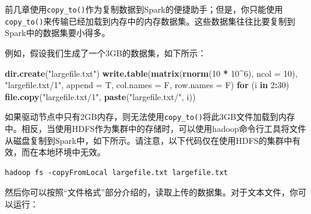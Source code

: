 \documentclass[
]{article}
\newenvironment{Shaded}{\begin{snugshade}}{\end{snugshade}}
\newcommand{\ControlFlowTok}[1]{\textcolor[rgb]{0.13,0.29,0.53}{\textbf{#1}}}
\newcommand{\DataTypeTok}[1]{\textcolor[rgb]{0.13,0.29,0.53}{#1}}
\newcommand{\DecValTok}[1]{\textcolor[rgb]{0.00,0.00,0.81}{#1}}
\newcommand{\KeywordTok}[1]{\textcolor[rgb]{0.13,0.29,0.53}{\textbf{#1}}}
\newcommand{\NormalTok}[1]{#1}
\newcommand{\OperatorTok}[1]{\textcolor[rgb]{0.81,0.36,0.00}{\textbf{#1}}}
\newcommand{\StringTok}[1]{\textcolor[rgb]{0.31,0.60,0.02}{#1}}
\begin{document}
前几章使用\texttt{copy\_to()}作为复制数据到Spark的便捷助手；但是，你只能使用\texttt{copy\_to()}来传输已经加载到内存中的内存数据集。这些数据集往往比要复制到Spark中的数据集要小得多。

例如，假设我们生成了一个3GB的数据集，如下所示：

\begin{Shaded}
\begin{Highlighting}[]
\KeywordTok{dir.create}\NormalTok{(}\StringTok{"largefile.txt"}\NormalTok{)}
\KeywordTok{write.table}\NormalTok{(}\KeywordTok{matrix}\NormalTok{(}\KeywordTok{rnorm}\NormalTok{(}\DecValTok{10} \OperatorTok{*}\StringTok{ }\DecValTok{10}\OperatorTok{^}\DecValTok{6}\NormalTok{), }\DataTypeTok{ncol =} \DecValTok{10}\NormalTok{), }\StringTok{"largefile.txt/1"}\NormalTok{, }\DataTypeTok{append =}\NormalTok{ T, }\DataTypeTok{col.names =}\NormalTok{ F, }
    \DataTypeTok{row.names =}\NormalTok{ F)}
\ControlFlowTok{for}\NormalTok{ (i }\ControlFlowTok{in} \DecValTok{2}\OperatorTok{:}\DecValTok{30}\NormalTok{) }\KeywordTok{file.copy}\NormalTok{(}\StringTok{"largefile.txt/1"}\NormalTok{, }\KeywordTok{paste}\NormalTok{(}\StringTok{"largefile.txt/"}\NormalTok{, i))}
\end{Highlighting}
\end{Shaded}

如果驱动节点中只有2GB内存，则无法使用\texttt{copy\_to()}将此3GB文件加载到内存中。相反，当使用HDFS作为集群中的存储时，可以使用hadoop命令行工具将文件从磁盘复制到Spark中，如下所示。请注意，以下代码仅在使用HDFS的集群中有效，而在本地环境中无效。

\begin{verbatim}
hadoop fs -copyFromLocal largefile.txt largefile.txt
\end{verbatim}

然后你可以按照``文件格式''部分介绍的，读取上传的数据集。对于文本文件，你可以运行：
\end{document}
